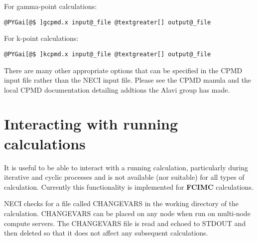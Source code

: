 \documentclass[openany,a4paper,10pt,english]{manual}
\begin{document}
For gamma-point calculations:

\begin{Verbatim}[commandchars=@\[\]]
@PYGai[@$ ]gcpmd.x input@_file @textgreater[] output@_file
\end{Verbatim}

For k-point calculations:

\begin{Verbatim}[commandchars=@\[\]]
@PYGai[@$ ]kcpmd.x input@_file @textgreater[] output@_file
\end{Verbatim}

There are many other appropriate options that can be specified in the
CPMD input file rather than the NECI input file.  Please see the CPMD
manula and the local CPMD documentation detailing addtions the Alavi
group has made.


\section{Interacting with running calculations}

It is useful to be able to interact with a running calculation, particularly
during iterative and cyclic processes and is not available (nor suitable) for
all types of calculation.  Currently this functionality is implemented for
\textbf{FCIMC} calculations.

NECI checks for a file called CHANGEVARS in the working directory of the
calculation.  CHANGEVARS can be placed on any node when run on multi-node
compute servers.  The CHANGEVARS file is read and echoed to STDOUT and
then deleted so that it does not affect any subsequent calculations.
\end{document}
